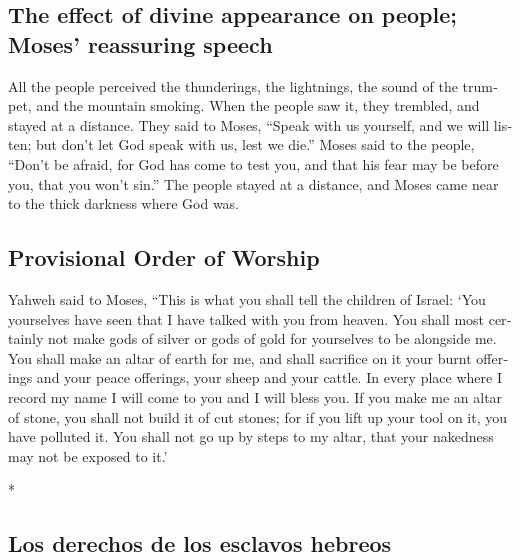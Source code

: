\begin{paracol}{2}
\begin{otherlanguage}{english}
\hypertarget{the-effect-of-divine-appearance-on-people-moses-reassuring-speech}{%
\subsection{The effect of divine appearance on people; Moses' reassuring
speech}\label{the-effect-of-divine-appearance-on-people-moses-reassuring-speech}}

 All the people perceived the thunderings, the
lightnings, the sound of the trumpet, and the mountain smoking. When the
people saw it, they trembled, and stayed at a distance. 
They said to Moses, ``Speak with us yourself, and we will listen; but
don't let God speak with us, lest we die.''  Moses said
to the people, ``Don't be afraid, for God has come to test you, and that
his fear may be before you, that you won't sin.''  The
people stayed at a distance, and Moses came near to the thick darkness
where God was.

\hypertarget{provisional-order-of-worship}{%
\subsection{Provisional Order of
Worship}\label{provisional-order-of-worship}}

 Yahweh said to Moses, ``This is what you shall tell the
children of Israel: `You yourselves have seen that I have talked with
you from heaven.  You shall most certainly not make gods
of silver or gods of gold for yourselves to be alongside me.
 You shall make an altar of earth for me, and shall
sacrifice on it your burnt offerings and your peace offerings, your
sheep and your cattle. In every place where I record my name I will come
to you and I will bless you.  If you make me an altar of
stone, you shall not build it of cut stones; for if you lift up your
tool on it, you have polluted it.  You shall not go up by
steps to my altar, that your nakedness may not be exposed to it.'

\end{otherlanguage}

\switchcolumn[0]*

\hypertarget{los-derechos-de-los-esclavos-hebreos}{%
\subsection{Los derechos de los esclavos
hebreos}\label{los-derechos-de-los-esclavos-hebreos}}


\end{paracol}
